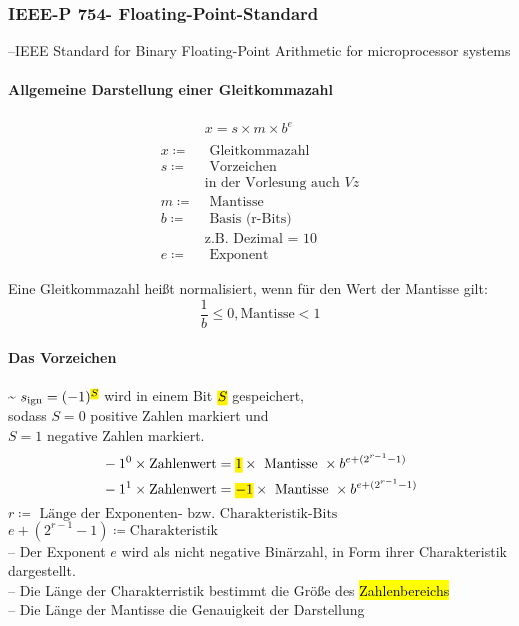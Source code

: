 \documentclass[a4paper]{scrartcl}
\begin{document}
			\subsubsection{IEEE-P 754- Floating-Point-Standard}
			--IEEE Standard for Binary Floating-Point Arithmetic for microprocessor systems\\
			
			\paragraph{Allgemeine Darstellung einer Gleitkommazahl}
			 \begin{align*}
			 	&x = s \times m \times b^e\\
			 	\\
			 	x \coloneqq& \text{ Gleitkommazahl}\\
			 	s \coloneqq& \text{ Vorzeichen }\\
			 		&\text{in der Vorlesung auch }Vz\\
			 	m \coloneqq& \text{ Mantisse}\\
			 	b \coloneqq& \text{ Basis (r-Bits) }\\
			 	&\text{z.B. Dezimal = 10}\\
			 	e \coloneq& \text{ Exponent}
			 \end{align*}
			 
			 Eine Gleitkommazahl heißt normalisiert, wenn für den Wert der Mantisse gilt: \\
			 \[ \frac{1}{b} \leq 0,\text{Mantisse} < 1 \]
			 
			 \paragraph{Das Vorzeichen}
			 \~{} \( s_{\text{ign}} = (-1)^{\text{\hl{$S$}}} \) wird in einem Bit \(\text{\hl{$S$}}\) gespeichert, \\
			 sodass \( S = 0 \) positive Zahlen markiert und\\
			 \(  S = 1\) negative Zahlen markiert.\\ 
			 \begin{align*}
			 	&-1^0 \times \text{Zahlenwert} = \text{\hl{$1$}}\times \text{ Mantisse } \times b^{e + (2^{r-1}-1)} \\
			 	&-1^1\times \text{Zahlenwert} = \text{\hl{$-1$}} \times \text{ Mantisse } \times b^{e + (2^{r-1}-1)} \\
			 \end{align*}
			 \( r \coloneqq \text{ Länge der Exponenten- bzw. Charakteristik-Bits} \)\\
			 \( e + (2^{r-1}-1) \coloneqq \text{Charakteristik}  \)
			 \\
			 -- Der Exponent \(e\) wird als nicht negative Binärzahl, in Form ihrer Charakteristik dargestellt.\\
			 -- Die Länge der Charakterristik bestimmt die Größe des \hl{Zahlenbereichs}\\
			 -- Die Länge der Mantisse die Genauigkeit der Darstellung\\
			  
\end{document}
